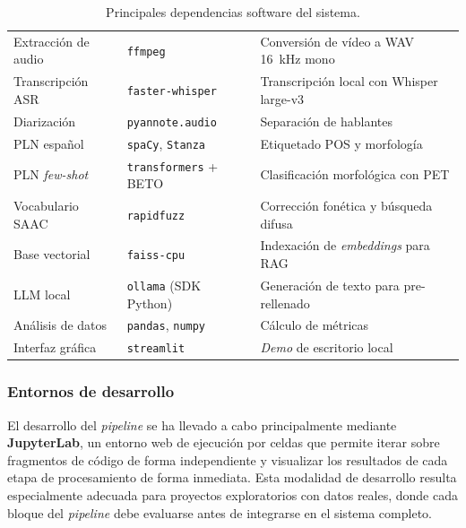 \begin{table}[h]
  \footnotesize
  \renewcommand{\arraystretch}{1.3}
  \setlength{\tabcolsep}{4pt}
  \begin{center}
  \begin{tabular}{|L{3.5cm}|L{4.0cm}|L{6.5cm}|}
  \hline
   &  &  \\ \hline
  Extracción de audio    & \texttt{ffmpeg}                  & Conversión de vídeo a WAV 16~kHz mono \\ \hline
  Transcripción \ac{ASR} & \texttt{faster-whisper}          & Transcripción local con Whisper large-v3 \\ \hline
  Diarización            & \texttt{pyannote.audio}          & Separación de hablantes \\ \hline
  \ac{PLN} español       & \texttt{spaCy}, \texttt{Stanza}  & Etiquetado \ac{POS} y morfología \\ \hline
  \ac{PLN} \emph{few-shot} & \texttt{transformers} + BETO   & Clasificación morfológica con \ac{PET} \\ \hline
  Vocabulario \ac{SAAC}  & \texttt{rapidfuzz}               & Corrección fonética y búsqueda difusa \\ \hline
  Base vectorial         & \texttt{faiss-cpu}               & Indexación de \emph{embeddings} para \ac{RAG} \\ \hline
  \ac{LLM} local         & \texttt{ollama} (SDK Python)     & Generación de texto para pre-rellenado \\ \hline
  Análisis de datos      & \texttt{pandas}, \texttt{numpy}  & Cálculo de métricas \\ \hline
  Interfaz gráfica       & \texttt{streamlit}               & \emph{Demo} de escritorio local \\ \hline
  \end{tabular}
  \end{center}
  \caption[Dependencias software]{Principales dependencias software del sistema.}
  \label{tab:dependencias}
  \renewcommand{\arraystretch}{1}
\end{table}


\subsubsection{Entornos de desarrollo}

El desarrollo del \emph{pipeline} se ha llevado a cabo principalmente mediante
\textbf{JupyterLab}, un entorno web de ejecución por celdas que permite iterar sobre
fragmentos de código de forma independiente y visualizar los resultados de cada etapa
de procesamiento de forma inmediata. Esta modalidad de desarrollo resulta especialmente
adecuada para proyectos exploratorios con datos reales, donde cada bloque del
\emph{pipeline} debe evaluarse antes de integrarse en el sistema completo.

